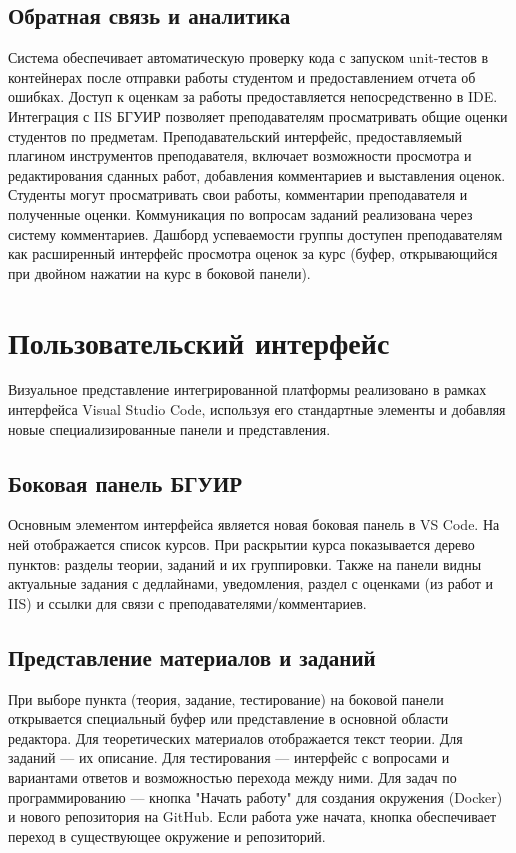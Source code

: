 \documentclass{bsuir}
\begin{document}
\subsection{Обратная связь и аналитика}

Система обеспечивает автоматическую проверку кода с запуском unit-тестов в
контейнерах после отправки работы студентом и предоставлением отчета об ошибках.
Доступ к оценкам за работы предоставляется непосредственно в IDE. Интеграция с
IIS БГУИР позволяет преподавателям просматривать общие оценки студентов по предметам.
Преподавательский интерфейс, предоставляемый плагином инструментов преподавателя,
включает возможности просмотра и редактирования сданных работ, добавления комментариев
и выставления оценок. Студенты могут просматривать свои работы, комментарии
преподавателя и полученные оценки. Коммуникация по вопросам заданий реализована
через систему комментариев. Дашборд успеваемости группы доступен преподавателям
как расширенный интерфейс просмотра оценок за курс (буфер, открывающийся при
двойном нажатии на курс в боковой панели).

\section{Пользовательский интерфейс}

Визуальное представление интегрированной платформы реализовано в рамках интерфейса
Visual Studio Code, используя его стандартные элементы и добавляя новые
специализированные панели и представления.

\subsection{Боковая панель БГУИР}

Основным элементом интерфейса является новая боковая панель в VS Code. На ней
отображается список курсов. При раскрытии курса показывается дерево пунктов:
разделы теории, заданий и их группировки. Также на панели видны актуальные
задания с дедлайнами, уведомления, раздел с оценками (из работ и IIS) и ссылки
для связи с преподавателями/комментариев.

\subsection{Представление материалов и заданий}

При выборе пункта (теория, задание, тестирование) на боковой панели открывается
специальный буфер или представление в основной области редактора. Для теоретических
материалов отображается текст теории. Для заданий — их описание. Для тестирования
— интерфейс с вопросами и вариантами ответов и возможностью перехода между ними.
Для задач по программированию — кнопка "Начать работу" для создания окружения
(Docker) и нового репозитория на GitHub. Если работа уже начата, кнопка
обеспечивает переход в существующее окружение и репозиторий.
\end{document}
